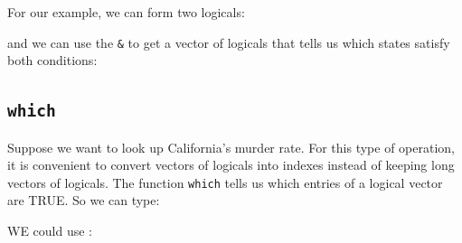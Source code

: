 \documentclass[
]{krantz}
\newenvironment{Shaded}{\begin{snugshade}}{\end{snugshade}}
\newcommand{\CommentTok}[1]{\textcolor[rgb]{0.37,0.37,0.37}{\textit{#1}}}
\newcommand{\DecValTok}[1]{\textcolor[rgb]{0.06,0.06,0.06}{#1}}
\newcommand{\KeywordTok}[1]{\textcolor[rgb]{0.27,0.27,0.27}{\textbf{#1}}}
\newcommand{\NormalTok}[1]{#1}
\newcommand{\OperatorTok}[1]{\textcolor[rgb]{0.43,0.43,0.43}{\textbf{#1}}}
\newcommand{\StringTok}[1]{\textcolor[rgb]{0.5,0.5,0.5}{#1}}
\begin{document}
For our example, we can form two logicals:

\begin{Shaded}
\end{Shaded}

and we can use the \texttt{\&} to get a vector of logicals that tells us which states satisfy both conditions:

\begin{Shaded}
\end{Shaded}

\hypertarget{which}{%
\subsection{\texorpdfstring{\texttt{which}}{which}}\label{which}}

Suppose we want to look up California's murder rate. For this type of operation, it is convenient to convert vectors of logicals into indexes instead of keeping long vectors of logicals. The function \texttt{which} tells us which entries of a logical vector are TRUE. So we can type:

\begin{Shaded}
\end{Shaded}

WE could use :

\begin{Shaded}
\end{Shaded}
\end{document}
